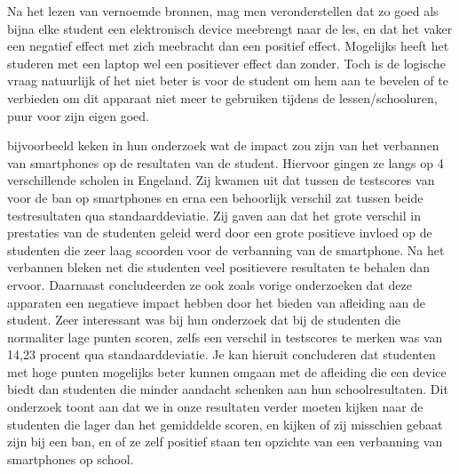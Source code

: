 Na het lezen van vernoemde bronnen, mag men veronderstellen dat zo goed als bijna elke student een elektronisch device meebrengt naar de les, en dat het vaker een negatief effect met zich meebracht dan een positief effect. Mogelijks heeft het studeren met een laptop wel een positiever effect dan zonder. Toch is de logische vraag natuurlijk of het niet beter is voor de student om hem aan te bevelen of te verbieden om dit apparaat niet meer te gebruiken tijdens de lessen/schooluren, puur voor zijn eigen goed.

\textcite{Beland2016} bijvoorbeeld keken in hun onderzoek wat de impact zou zijn van het verbannen van smartphones op de resultaten van de student. Hiervoor gingen ze langs op 4 verschillende scholen in Engeland. Zij kwamen uit dat tussen de testscores van voor de ban op smartphones en erna een behoorlijk verschil zat tussen beide testresultaten qua standaarddeviatie. Zij gaven aan dat het grote verschil in prestaties van de studenten geleid werd door een grote positieve invloed op de studenten die zeer laag scoorden voor de verbanning van de smartphone. Na het verbannen bleken net die studenten veel positievere resultaten te behalen dan ervoor. Daarnaast concludeerden ze ook zoals vorige onderzoeken dat deze apparaten een negatieve impact hebben door het bieden van afleiding aan de student. Zeer interessant was bij hun onderzoek dat bij de studenten die normaliter lage punten scoren, zelfs een verschil in testscores te merken was van 14,23 procent qua standaarddeviatie. Je kan hieruit concluderen dat studenten met hoge punten mogelijks beter kunnen omgaan met de afleiding die een device biedt dan studenten die minder aandacht schenken aan hun schoolresultaten. Dit onderzoek toont aan dat we in onze resultaten verder moeten kijken naar de studenten die lager dan het gemiddelde scoren, en kijken of zij misschien gebaat zijn bij een ban, en of ze zelf positief staan ten opzichte van een verbanning van smartphones op school.

